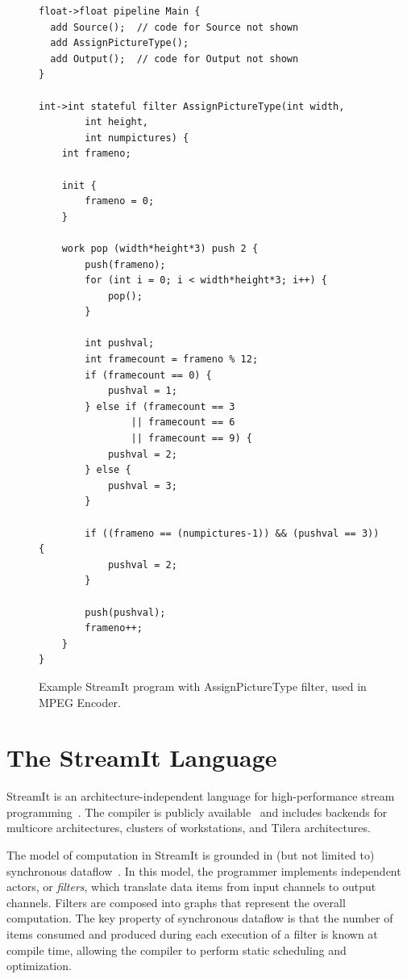 \begin{figure}[t]
\eightpoint
\begin{verbatim}
float->float pipeline Main {
  add Source();  // code for Source not shown
  add AssignPictureType();
  add Output();  // code for Output not shown
}

int->int stateful filter AssignPictureType(int width, 
        int height, 
        int numpictures) {
    int frameno;

    init {
        frameno = 0;
    }

    work pop (width*height*3) push 2 {
        push(frameno);
        for (int i = 0; i < width*height*3; i++) {
            pop();
        }

        int pushval;
        int framecount = frameno % 12;
        if (framecount == 0) {
            pushval = 1;
        } else if (framecount == 3 
                || framecount == 6 
                || framecount == 9) {
            pushval = 2;
        } else {
            pushval = 3;
        }

        if ((frameno == (numpictures-1)) && (pushval == 3)) {
            pushval = 2;
        }

        push(pushval);
        frameno++;
    }
}

\end{verbatim}

\caption{Example StreamIt program with AssignPictureType filter, used in MPEG Encoder.\protect\label{fig:apt-pipeline}}
\end{figure}

\section{The StreamIt Language}

StreamIt is an architecture-independent language for high-performance
stream programming~\cite{thies-cc02}.  The compiler is publicly
available~\cite{streamitweb} and includes backends for multicore
architectures, clusters of workstations, and Tilera architectures.

The model of computation in StreamIt is grounded in (but not limited
to) synchronous dataflow~\cite{lee87}.  In this model, the programmer
implements independent actors, or {\it filters}, which translate data
items from input channels to output channels.  Filters are composed
into graphs that represent the overall computation.  The key property
of synchronous dataflow is that the number of items consumed and
produced during each execution of a filter is known at compile time,
allowing the compiler to perform static scheduling and optimization.

